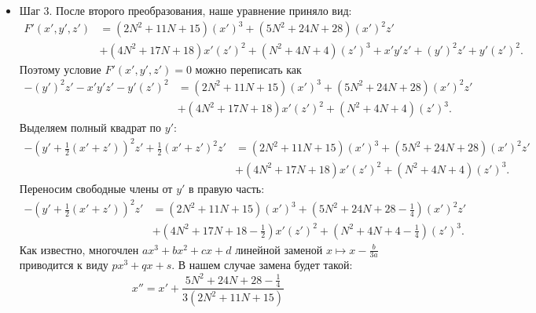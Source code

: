 \documentclass[a4paper,12pt]{article}
\theoremstyle{definition}
\begin{document}
\begin{itemize}[leftmargin=0.6cm]
        \item Шаг 3. После второго преобразования, наше уравнение приняло вид:
        \begin{align*}
            F'(x', y', z') &= \left(2 N^2 + 11 N + 15\right) \left( x' \right)^3
            + \left(5 N^2 + 24 N + 28\right) \left( x' \right)^2 z' \\ &+ \left(4 N^2
            + 17 N + 18\right) x' \left( z' \right)^2 + \left(N^2 + 4 N +
            4\right) \left( z' \right)^3  + x' y' z' + \left( y' \right)^2 z' + y'
            \left( z' \right)^2 
        .\end{align*}
        Поэтому условие \(F'(x', y', z') = 0\) можно переписать как 
        \begin{align*}
           -\left( y' \right)^2 z' - x' y' z' - y'
            \left( z' \right)^2 &= \left(2 N^2 + 11 N + 15\right) \left( x' \right)^3
            + \left(5 N^2 + 24 N + 28\right) \left( x' \right)^2 z' \\ &+ \left(4 N^2
            + 17 N + 18\right) x' \left( z' \right)^2 + \left(N^2 + 4 N +
            4\right) \left( z' \right)^3
        .\end{align*}
        Выделяем полный квадрат по \(y'\):
        \begin{align*}
           -\left( y' + \frac{1}{2}(x' + z')  \right)^2 z' + \frac{1}{2} (x' +
           z')^2 z' &= \left(2 N^2 + 11 N + 15\right) \left( x' \right)^3
            + \left(5 N^2 + 24 N + 28\right) \left( x' \right)^2 z' \\ &+ \left(4 N^2
            + 17 N + 18\right) x' \left( z' \right)^2 + \left(N^2 + 4 N +
            4\right) \left( z' \right)^3
        .\end{align*}
        Переносим свободные члены от \(y'\) в правую часть:
        \begin{align*}
           -\left( y' + \frac{1}{2}(x' + z')  \right)^2 z' &= \left(2 N^2 + 11 N + 15\right) \left( x' \right)^3
            + \left(5 N^2 + 24 N + 28 - \frac{1}{4} \right) \left( x' \right)^2 z' \\ &+ \left(4 N^2
            + 17 N + 18 - \frac{1}{2} \right) x' \left( z' \right)^2 + \left(N^2 + 4 N +
            4 - \frac{1}{4} \right) \left( z' \right)^3
        .\end{align*}
        Как известно, многочлен \(a x^3 + b x^2 + c x + d\) линейной заменой \(x
        \mapsto x - \frac{b}{3 a}\)
        приводится к виду \(p x^3 + q x + s\). В нашем
        случае замена будет такой:
        \[
        x'' = x' + \frac{5 N^2 + 24 N + 28 - \frac{1}{4}}{3(2 N^2 + 11 N + 15)}
\]
\end{itemize}
\end{document}
